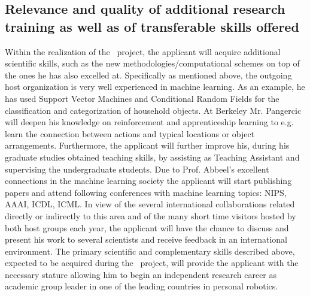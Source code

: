 \subsection{Relevance and quality of additional research training as well as of transferable skills offered}
Within the realization of the  \ksem\ project, the applicant will acquire additional 
scientific skills, such as the new methodologies/computational schemes on top of the 
ones he has also excelled at. Specifically as mentioned above, the outgoing host organization 
is very well experienced in machine learning.  As an example, he has used Support Vector Machines
and Conditional Random Fields for the classification and categorization of household objects.
At Berkeley Mr. Pangercic will deepen his knowledge on reinforcement and apprenticeship learning
to e.g. learn the connection between actions and typical locations or object arrangements.
Furthermore, the applicant will further improve his, during his graduate studies obtained teaching 
skills, by assisting as Teaching Assistant and supervising the undergraduate students.
Due to Prof. Abbeel's excellent connections in the machine learning society the applicant 
will start publishing papers and attend following conferences with machine learning topics:
NIPS, AAAI, ICDL, ICML. In view of the several international collaborations related directly 
or indirectly to this area and of the many short time visitors hosted by both host groups each year, 
the applicant will have the  chance to discuss and present his work to several scientists and 
receive feedback in an international environment. The primary scientific and 
complementary skills described above, expected to be acquired during the \ksem\ 
project, will provide the applicant  with  the necessary stature allowing  him to begin an 
independent research career as academic group leader in one of the leading countries in personal
robotics.
